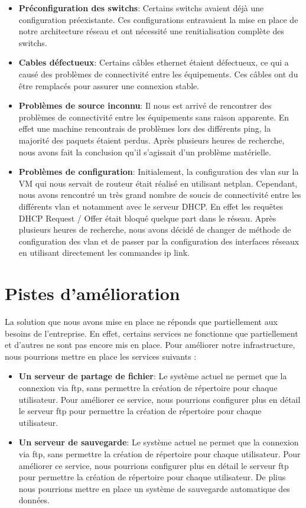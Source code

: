 \documentclass[a4paper,12pt]{report}
\begin{document}
            \begin{itemize}
                \item \textbf{Préconfiguration des switchs}: Certains switchs avaient déjà une configuration préexistante. Ces configurations entravaient la mise en place de notre architecture réseau et ont nécessité une renitialisation complète des switchs.
                \item \textbf{Cables défectueux}: Certains câbles ethernet étaient défectueux, ce qui a causé des problèmes de connectivité entre les équipements. Ces câbles ont du être remplacés pour assurer une connexion stable.
                \item \textbf{Problèmes de source inconnu}: Il nous est arrivé de rencontrer des problèmes de connectivité entre les équipements sans raison apparente. En effet une machine rencontrais de problèmes lors des différents ping, la majorité des paquets étaient perdus. Après plusieurs heures de recherche, nous avons fait la conclusion qu'il s'agissait d'un problème matérielle.
                \item \textbf{Problèmes de configuration}: Initialement, la configuration des vlan sur la VM qui nous servait de routeur était réalisé en utilisant netplan. Cependant, nous avons rencontré un très grand nombre de soucis de connectivité entre les différents vlan et notamment avec le serveur DHCP. En effet les requêtes DHCP Request / Offer était bloqué quelque part dans le réseau. Après plusieurs heures de recherche, nous avons décidé de changer de méthode de configuration des vlan et de passer par la configuration des interfaces réseaux en utilisant directement les commandes ip link. 
            \end{itemize}

        \section{Pistes d'amélioration}
            La solution que nous avons mise en place ne réponds que partiellement aux besoins de l'entreprise. En effet, certains services ne fonctionne que partiellement et d'autres ne sont pas encore mis en place. Pour améliorer notre infrastructure, nous pourrions mettre en place les services suivants :

            \begin{itemize}
                \item \textbf{Un serveur de partage de fichier}: Le système actuel ne permet que la connexion via ftp, sans permettre la création de répertoire pour chaque utilisateur. Pour améliorer ce service, nous pourrions configurer plus en détail le serveur ftp pour permettre la création de répertoire pour chaque utilisateur.
                \item \textbf{Un serveur de sauvegarde}: Le système actuel ne permet que la connexion via ftp, sans permettre la création de répertoire pour chaque utilisateur. Pour améliorer ce service, nous pourrions configurer plus en détail le serveur ftp pour permettre la création de répertoire pour chaque utilisateur. De plius nous pourrions mettre en place un système de sauvegarde automatique des données.
            \end{itemize} 
\end{document}
